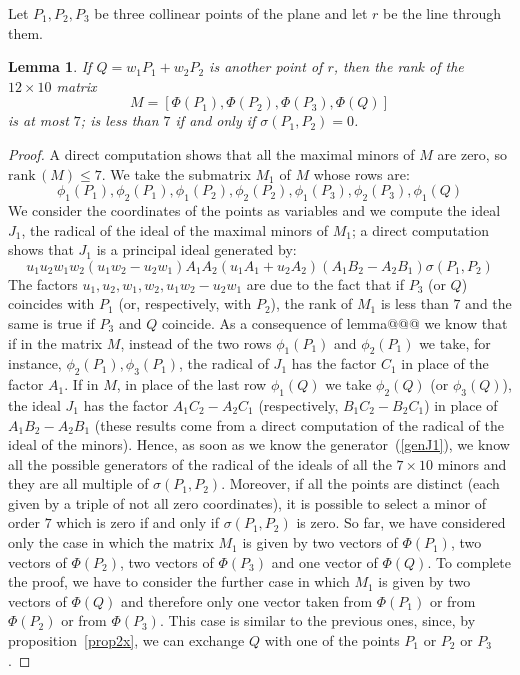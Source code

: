 \documentclass{amsart}
\theoremstyle{plain}
\newtheorem{lemma}[theorem]{Lemma}
\theoremstyle{definition}
\begin{document}
Let $P_1, P_2, P_3$ be three collinear points of the plane and let $r$
be the line through them. 
\begin{lemma}
  If $Q = w_1P_1+w_2P_2$ is another point of $r$,
  then the rank of the $12\times 10$ matrix
\begin{equation}
M = \left[
\Phi(P_1), \Phi(P_2), \Phi(P_3), \Phi(Q)
\right]
\label{vecchiaMat@@}
\end{equation}
is at most $7$; is less than $7$ if and only if $\sigma(P_1, P_2) = 0$.
\end{lemma}
%
\label{condizSigma}
\begin{proof}
  A direct computation shows that all the maximal minors of $M$ are
  zero, so $\mathrm{rank}\,(M) \leq 7$.
  We take the submatrix $M_1$ of $M$ whose rows are:
  \[
\phi_1(P_1), \phi_2(P_1), \phi_1(P_2), \phi_2(P_2),
\phi_1(P_3), \phi_2(P_3), \phi_1(Q)
  \]
  We consider the coordinates of the points as variables and we compute
  the ideal $J_1$, the radical of the ideal of the maximal minors of $M_1$;
  a direct computation shows that $J_1$ is a principal ideal generated by:
  \begin{equation}
    u_1u_2w_1w_2(u_1w_2-u_2w_1)A_1A_2(u_1A_1+u_2A_2)(A_1B_2-A_2B_1)\sigma(P_1,P_2)
    \label{genJ1}
  \end{equation}
  The factors $u_1, u_2, w_1, w_2, u_1w_2-u_2w_1$ are due to the fact that if
  $P_3$ (or $Q$) coincides with $P_1$ (or, respectively, with $P_2$),
  the rank of $M_1$ is less than $7$
  and the same is true if $P_3$ and $Q$ coincide. As a consequence of
  lemma@@@
  we know that if in the matrix $M$, instead of the two rows
  $\phi_1(P_1)$ and $\phi_2(P_1)$ we take, for instance,
  $\phi_2(P_1), \phi_3(P_1)$, the radical of $J_1$ has the factor
  $C_1$ in place of
  the factor $A_1$. If in $M$, in place of the last row
  $\phi_1(Q)$ we take $\phi_2(Q)$ (or $\phi_3(Q)$), the ideal
  $J_1$ has the factor $A_1C_2-A_2C_1$ (respectively, $B_1C_2-B_2C_1$) in
  place of $A_1B_2-A_2B_1$ (these results come from a direct computation
  of the radical of the ideal of the minors).
  Hence, as soon as we know the generator~(\ref{genJ1}), we know all the
  possible generators of the radical of the ideals of all the $7\times 10$
  minors and they are all multiple of $\sigma(P_1, P_2)$. Moreover, if
  all the points are distinct (each given by a triple of not all zero
  coordinates), it is possible to select a minor of order $7$ which
  is zero if and only if $\sigma(P_1, P_2)$ is zero. 
  So far, we have considered only the case in which the matrix
  $M_1$ is given by two vectors of $\Phi(P_1)$, two vectors of
  $\Phi(P_2)$, two vectors of $\Phi(P_3)$ and one vector of $\Phi(Q)$.
  To complete the proof, we have to consider the further case in which
  $M_1$ is given by two vectors of $\Phi(Q)$ and therefore only one
  vector taken from $\Phi(P_1)$ or from $\Phi(P_2)$ or from $\Phi(P_3)$.
  This case is similar to the previous ones, since, by
  proposition~\ref{prop2x}, we can exchange $Q$ with one of the points
  $P_1$ or $P_2$ or $P_3$.
\end{proof}
\end{document}
